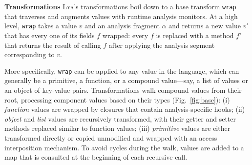 \documentclass[letterpaper,twocolumn,10pt]{article}
\newcommand{\heading}[1]{\vspace{2pt}\noindent\textbf{#1}\enspace}
\newcommand{\ttt}[1]{\texttt{#1}}
\newcommand{\sys}{{\scshape Lya}\xspace}
\newcommand{\pc}{PIC\xspace}
\begin{document}
\heading{Transformations}
\sys's transformations boil down to a base transform \ttt{wrap} that traverses and augments values with runtime analysis monitors.
At a high level, \ttt{wrap} takes a value $v$ and an analysis fragment $\alpha$ and returns a new value $v'$ that has every one of its fields $f$ wrapped:
   every $f$ is replaced with a method $f'$ that returns the result of calling $f$ after applying the analysis segment corresponding to $v$.

More specifically, \ttt{wrap} can be applied to any value in the language, which can generally be a primitive, a function, or a compound value---say, a list of values or an object of key-value pairs.
Transformations walk compound values from their root, processing component values based on their types (Fig.~\ref{fig:base}):
  (i) \emph{function} values are wrapped by closures that contain analysis-specific hooks; %
  (ii) \emph{object} and \emph{list} values are recursively transformed, with their getter and setter methods replaced similar to function values; %
  (iii) \emph{primitive} values are either transformed directly or copied unmodified and wrapped with an access interposition mechanism.
To avoid cycles during the walk, values are added to a map that is consulted at the beginning of each recursive call.


% 
% 
% 
\end{document}
